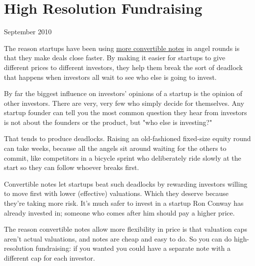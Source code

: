 \chapter{High Resolution Fundraising}


            
              
                


                  
                    September 2010

The reason startups have been
                    using
                    \href{http://twitter.com/paulg/status/22319113993}{more convertible notes}
                    in angel rounds is that they make deals close faster. By
                    making it easier for startups to give different prices to
                    different investors, they help them break the sort of
                    deadlock that happens when investors all wait to see who
                    else is going to invest.

By far the biggest
                    influence on investors' opinions of a startup is the opinion
                    of other investors. There are very, very few who simply
                    decide for themselves. Any startup founder can tell you the
                    most common question they hear from investors is not about
                    the founders or the product, but "who else is investing?"

That
                    tends to produce deadlocks. Raising an old-fashioned
                    fixed-size equity round can take weeks, because all the
                    angels sit around waiting for the others to commit, like
                    competitors in a bicycle sprint who deliberately ride slowly
                    at the start so they can follow whoever breaks first.

Convertible
                    notes let startups beat such deadlocks by rewarding
                    investors willing to move first with lower (effective)
                    valuations. Which they deserve because they're taking more
                    risk. It's much safer to invest in a startup Ron Conway has
                    already invested in; someone who comes after him should pay
                    a higher price.

The reason convertible notes
                    allow more flexibility in price is that valuation caps
                    aren't actual valuations, and notes are cheap and easy to
                    do. So you can do high-resolution fundraising: if you wanted
                    you could have a separate note with a different cap for each
                    investor.

